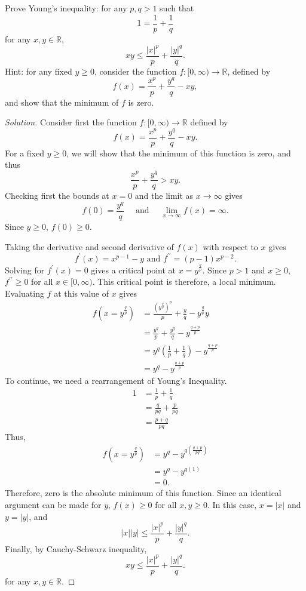 \documentclass[11pt,letterpaper]{article}
\newcommand{\R}{\mathbb{R}}
\newenvironment{prob}[1]
  {\renewcommand\theinnerprob{#1}\innerprob}
  {\endinnerprob}
\newenvironment{solution}
  {\renewcommand\qedsymbol{}\begin{proof}[Solution]}
  {\end{proof}\bigskip}
\begin{document}
\begin{prob}{4}  %
Prove Young's inequality: for any $p,q >1$ such that
\[
	1
		= \frac{1}{p} + \frac{1}{q}
\]
for any $x,y\in \R$,
\[
	xy \leq \frac{|x|^p}{p} + \frac{|y|^q}{q}.
\]
Hint: for any fixed $y \geq 0$, consider the function $f: [0,\infty) \to \R$, defined by
\[
	f(x) = \frac{x^p}{p} + \frac{y^q}{q} - xy,
\]
and show that the minimum of $f$ is zero.
\end{prob}
\begin{solution}
	Consider first the function $f:[0,\infty)\to \R$ defined by
	\[
	f(x) = \frac{x^p}{p} + \frac{y^q}{q} - xy.
	\]
	For a fixed $y\geq 0$, we will show that the minimum of this function is zero, and thus  
	\[
	\frac{x^p}{p} + \frac{y^q}{q} > xy.
	\]
	Checking first the bounds at $x=0$ and the limit as $x\to\infty$ gives $$f(0) = \frac{y^q}{q}\quad \text{ and }\quad \lim_{x\to\infty} f(x) = \infty.$$ Since $y\geq 0$, $f(0)\geq 0$.
	
	Taking the derivative and second derivative of $f(x)$ with respect to $x$ gives $$f^\prime(x)= x^{p-1}-y \text { and } f^{\prime \prime} = (p-1)x^{p-2}.$$ Solving for $f^\prime(x) = 0$ gives a critical point at $x = y^{\frac{q}{p}}$. Since $p>1$ and $x\geq 0$, $f^{\prime \prime} \geq 0$ for all $x\in [0,\infty)$. This critical point is therefore, a local minimum. Evaluating $f$ at this value of $x$ gives
	\[\begin{split}
		f(x = y^{\frac{q}{p}}) &= \frac{(y^{\frac{q}{p}})^p}{p} + \frac{y}{q} -y^{\frac{q}{p}}y\\
		&= \frac{y^q}{p}+\frac{y^q}{q}-y^{\frac{q+p}{p}}\\
		&= y^q \left ( \frac{1}{p} + \frac{1}{q} \right ) - y^{\frac{q+p}{p}}\\
		&=y^q - y^{\frac{q+p}{p}}
	\end{split}	
	\]
	To continue, we need a rearrangement of Young's Inequality.
	\[\begin{split}
		1 &= \frac{1}{p} + \frac{1}{q}\\
		&= \frac{q}{pq} + \frac{p}{pq}\\
		&= \frac{p+q}{pq}
	\end{split}
	\]
	Thus,
	\[\begin{split}
		f(x = y^{\frac{q}{p}}) &= y^q - y^{q(\frac{q+p}{pq})}\\
		&= y^q - y^{q(1)}\\
		& = 0.
	\end{split}	
	\]
	Therefore, zero is the absolute minimum of this function. Since an identical argument can be made for $y$, $f(x)\geq 0$ for all $x,y\geq 0$. In this case, $x = |x|$ and $y = |y|$, and $$|x||y| \leq \frac{|x|^p}{p} + \frac{|y|^q}{q}.$$ Finally, by Cauchy-Schwarz inequality, $$xy \leq \frac{|x|^p}{p} + \frac{|y|^q}{q}.$$ for any $x,y \in \R$.
	
\end{solution}
\newpage
\end{document}

